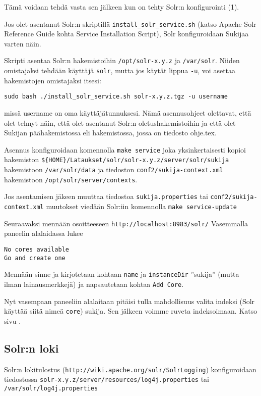 \documentclass[12pt]{article}
\begin{document}
Tämä voidaan tehdä vasta sen jälkeen kun on tehty Solr:n konfigurointi (1).

Jos olet asentanut Solr:n skriptillä \verb=install_solr_service.sh=
(katso Apache Solr Reference Guide kohta
Service Installation Script),
Solr konfiguroidaan Sukijaa varten näin.

Skripti asentaa Solr:n hakemistoihin \verb=/opt/solr-x.y.z= ja
\verb=/var/solr=. Niiden omistajaksi tehdään käyttäjä \verb=solr=,
mutta jos käytät lippua \verb=-u=, voi asettaa hakemistojen
omistajaksi itsesi:

\verb=sudo bash ./install_solr_service.sh solr-x.y.z.tgz -u username=

missä username on oma käyttäjätunnuksesi. Nämä asennusohjeet
olettavat, että olet tehnyt näin, että olet asentanut Solr:n
oletushakemistoihin ja että olet Sukijan päähakemistossa eli
hakemistossa, jossa on tiedosto ohje.tex.

Asennus konfiguroidaan komennolla \verb=make service=
joka yksinkertaisesti kopioi hakemiston
\verb=${HOME}/Lataukset/solr/solr-x.y.z/server/solr/sukija=
hakemistoon
\verb=/var/solr/data= ja tiedoston
\verb=conf2/sukija-context.xml= hakemistoon
\verb=/opt/solr/server/contexts=.


Jos asentamisen jäkeen muuttaa tiedostoa
\verb|sukija.properties| tai
\verb|conf2/sukija-context.xml|
muutokset viedään Solr:iin komennolla
\verb=make service-update=

Seuraavaksi mennään osoitteeseen \verb=http://localhost:8983/solr/=
Vasemmalla paneelin alalaidassa lukee 

\begin{verbatim}
No cores available
Go and create one
\end{verbatim}

Mennään sinne ja kirjotetaan kohtaan \verb=name= ja \verb=instanceDir=
''sukija'' (mutta ilman lainausmerkkejä) ja napsautetaan kohtaa
\verb=Add Core=.

Nyt vasempaan paneeliin alalaitaan pitäisi tulla mahdollisuus valita
indeksi (Solr käyttää siitä nimeä \verb=core=) sukija. Sen jälkeen
voimme ruveta indeksoimaan. Katso sivu .


\subsection*{Solr:n loki}

Solr:n lokitulostus (\verb=http://wiki.apache.org/solr/SolrLogging=)
konfiguroidaan tiedostossa
\verb=solr-x.y.z/server/resources/log4j.properties= tai
\verb=/var/solr/log4j.properties=
\end{document}
